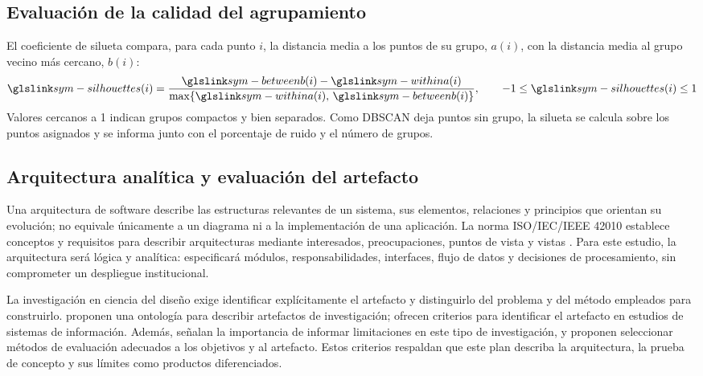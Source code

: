 \subsection{Evaluación de la calidad del agrupamiento}

El coeficiente de silueta compara, para cada punto $i$, la distancia media a los puntos de su grupo, $a(i)$, con la distancia media al grupo vecino más cercano, $b(i)$:
\begin{equation}
\symref{sym-silhouette}{s(i)} = \frac{\symref{sym-between}{b(i)} - \symref{sym-within}{a(i)}}{\max\{\symref{sym-within}{a(i)},\, \symref{sym-between}{b(i)}\}}, \qquad -1 \leq \symref{sym-silhouette}{s(i)} \leq 1
\label{eq:silueta}
\eqtitulo{Coeficiente de silueta.}
\end{equation}
Valores cercanos a 1 indican grupos compactos y bien separados. Como DBSCAN deja puntos sin grupo, la silueta se calcula sobre los puntos asignados y se informa junto con el porcentaje de ruido y el número de grupos.

\subsection{Arquitectura analítica y evaluación del artefacto}

Una arquitectura de software describe las estructuras relevantes de un sistema, sus elementos, relaciones y principios que orientan su evolución; no equivale únicamente a un diagrama ni a la implementación de una aplicación. La norma ISO/IEC/IEEE 42010 establece conceptos y requisitos para describir arquitecturas mediante interesados, preocupaciones, puntos de vista y vistas \citep{iso42010_2022}. Para este estudio, la arquitectura será lógica y analítica: especificará módulos, responsabilidades, interfaces, flujo de datos y decisiones de procesamiento, sin comprometer un despliegue institucional.

La investigación en ciencia del diseño exige identificar explícitamente el artefacto y distinguirlo del problema y del método empleados para construirlo. \citet{weigand2021artifact} proponen una ontología para describir artefactos de investigación; \citet{weigand2023artifact} ofrecen criterios para identificar el artefacto en estudios de sistemas de información. Además, \citet{barata2023limitations} señalan la importancia de informar limitaciones en este tipo de investigación, y \citet{schaeffer2025evaluation} proponen seleccionar métodos de evaluación adecuados a los objetivos y al artefacto. Estos criterios respaldan que este plan describa la arquitectura, la prueba de concepto y sus límites como productos diferenciados.

